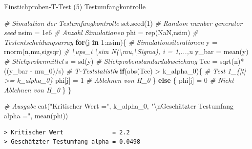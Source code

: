 \documentclass[
  8pt,
  ignorenonframetext,
]{beamer}
\newenvironment{Shaded}{\begin{snugshade}}{\end{snugshade}}
\newcommand{\CommentTok}[1]{\textcolor[rgb]{0.56,0.35,0.01}{\textit{#1}}}
\newcommand{\ConstantTok}[1]{\textcolor[rgb]{0.00,0.00,0.00}{#1}}
\newcommand{\ControlFlowTok}[1]{\textcolor[rgb]{0.13,0.29,0.53}{\textbf{#1}}}
\newcommand{\DecValTok}[1]{\textcolor[rgb]{0.00,0.00,0.81}{#1}}
\newcommand{\FloatTok}[1]{\textcolor[rgb]{0.00,0.00,0.81}{#1}}
\newcommand{\FunctionTok}[1]{\textcolor[rgb]{0.00,0.00,0.00}{#1}}
\newcommand{\NormalTok}[1]{#1}
\newcommand{\OtherTok}[1]{\textcolor[rgb]{0.56,0.35,0.01}{#1}}
\newcommand{\SpecialCharTok}[1]{\textcolor[rgb]{0.00,0.00,0.00}{#1}}
\newcommand{\StringTok}[1]{\textcolor[rgb]{0.31,0.60,0.02}{#1}}
\begin{document}
\begin{frame}[fragile]{Einstichproben-T-Test \textbar{} (5)
Testumfangkontrolle}
\begin{Shaded}
\begin{Highlighting}[]
\CommentTok{\# Simulation der Testumfangkontrolle}
\FunctionTok{set.seed}\NormalTok{(}\DecValTok{1}\NormalTok{)                                              }\CommentTok{\# Random number generator seed}
\NormalTok{nsim      }\OtherTok{=} \FloatTok{1e6}                                          \CommentTok{\# Anzahl Simulationen}
\NormalTok{phi       }\OtherTok{=} \FunctionTok{rep}\NormalTok{(}\ConstantTok{NaN}\NormalTok{,nsim)                                }\CommentTok{\# Testentscheidungsarray}
\ControlFlowTok{for}\NormalTok{(j }\ControlFlowTok{in} \DecValTok{1}\SpecialCharTok{:}\NormalTok{nsim)\{                                        }\CommentTok{\# Simulationsiterationen}
\NormalTok{    y      }\OtherTok{=} \FunctionTok{rnorm}\NormalTok{(n,mu,sigsqr)                          }\CommentTok{\# \textbackslash{}ups\_i \textbackslash{}sim N(\textbackslash{}mu,\textbackslash{}Sigma), i = 1,...,n}
\NormalTok{    y\_bar  }\OtherTok{=} \FunctionTok{mean}\NormalTok{(y)                                     }\CommentTok{\# Stichprobenmittel}
\NormalTok{    s      }\OtherTok{=} \FunctionTok{sd}\NormalTok{(y)                                       }\CommentTok{\# Stichprobenstandardabweichung}
\NormalTok{    Tee    }\OtherTok{=} \FunctionTok{sqrt}\NormalTok{(n)}\SpecialCharTok{*}\NormalTok{((y\_bar }\SpecialCharTok{{-}}\NormalTok{ mu\_0)}\SpecialCharTok{/}\NormalTok{s)                  }\CommentTok{\# T{-}Teststatistik}
    \ControlFlowTok{if}\NormalTok{(}\FunctionTok{abs}\NormalTok{(Tee) }\SpecialCharTok{\textgreater{}}\NormalTok{ k\_alpha\_0)\{                            }\CommentTok{\# Test 1\_\{|t| \textgreater{}= k\_alpha\_0\}}
\NormalTok{        phi[j] }\OtherTok{=} \DecValTok{1}                                       \CommentTok{\# Ablehnen von H\_0}
\NormalTok{    \} }\ControlFlowTok{else}\NormalTok{ \{}
\NormalTok{        phi[j] }\OtherTok{=} \DecValTok{0}                                       \CommentTok{\# Nicht Ablehnen von H\_0}
\NormalTok{    \}}
\NormalTok{\}}

\CommentTok{\# Ausgabe}
\FunctionTok{cat}\NormalTok{(}\StringTok{"Kritischer Wert              ="}\NormalTok{, k\_alpha\_0,}
    \StringTok{"}\SpecialCharTok{\textbackslash{}n}\StringTok{Geschätzter Testumfang alpha ="}\NormalTok{, }\FunctionTok{mean}\NormalTok{(phi))}
\end{Highlighting}
\end{Shaded}

\begin{verbatim}
> Kritischer Wert              = 2.2 
> Geschätzter Testumfang alpha = 0.0498
\end{verbatim}
\end{frame}
\end{document}
